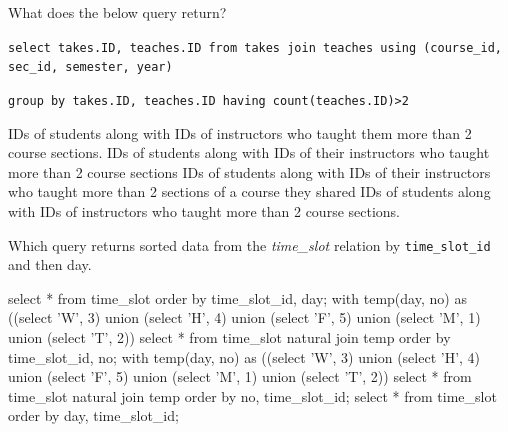 \documentclass[12pt, addpoints]{exam}
\begin{document}
\begin{questions}
\begin{minipage}{\linewidth}
\begin{checkboxes}
\end{checkboxes}
\end{minipage}

\begin{minipage}{\linewidth}
\question[3]
What does the below query return?\par\vspace{0.5em}

\texttt{select takes.ID, teaches.ID from takes join teaches using (course\_id, sec\_id, semester, year)}\par
\texttt{group by takes.ID, teaches.ID having count(teaches.ID)>2}\par\vspace{0.5em}

\begin{checkboxes}
    \CorrectChoice IDs of students along with IDs of instructors who taught them more than 2 course sections.
    \choice IDs of students along with IDs of their instructors who taught more than 2 course sections
    \choice IDs of students along with IDs of their instructors who taught more than 2 sections of a course they shared
    \choice IDs of students along with IDs of instructors who taught more than 2 course sections.
\end{checkboxes}
\end{minipage}

\begin{minipage}{\linewidth}
\question[3]
Which query returns sorted data from the \textit{time\_slot} relation by \texttt{time\_slot\_id} and then day.\par\vspace{0.5em}

\begin{checkboxes}
    \choice select * from time\_slot order by time\_slot\_id, day;
    \CorrectChoice with temp(day, no) as ((select 'W', 3) union (select 'H', 4) union (select 'F', 5) union
(select 'M', 1) union (select 'T', 2)) select * from time\_slot natural join temp order by time\_slot\_id, no;
    \choice with temp(day, no) as ((select 'W', 3) union (select 'H', 4) union
(select 'F', 5) union (select 'M', 1) union (select 'T', 2))
select * from time\_slot natural join temp order by no, time\_slot\_id;
    \choice select * from time\_slot order by day, time\_slot\_id;
\end{checkboxes}
\end{minipage}


\end{questions}
\end{document}
